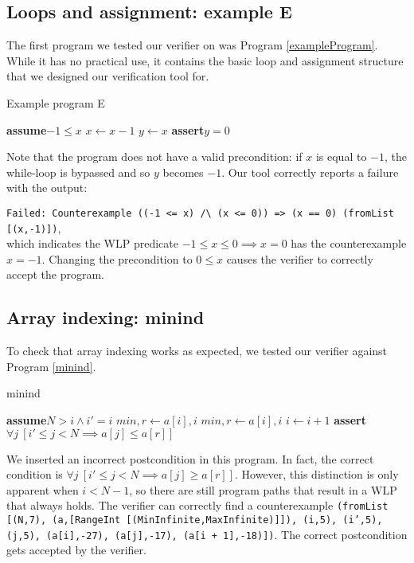 \documentclass[a4paper]{article}
\newcommand{\Assert}{\State\textbf{assert}\xspace}
\newcommand{\Assume}{\State\textbf{assume}\xspace}
\begin{document}
\subsection{Loops and assignment: example E}

The first program we tested our verifier on was Program \ref{exampleProgram}.
While it has no practical use, it contains the basic loop and assignment
structure that we designed our verification tool for.

\begin{algorithm}
\caption{Example program E} \label{exampleProgram}
\begin{algorithmic}
\Assume $-1 \leq x$
	\State $x \gets x - 1$
\EndWhile
\State $y \gets x$
\Assert $y = 0$
\end{algorithmic}
\end{algorithm}

Note that the program does not have a valid precondition: if $x$ is equal to
$-1$, the while-loop is bypassed and so $y$ becomes $-1$. Our tool correctly
reports a failure with the output:\par
\verb|Failed: Counterexample ((-1 <= x) /\ (x <= 0)) => (x == 0) (fromList [(x,-1)])|,\\
which indicates the WLP predicate $-1 \leq x \leq 0 \implies x = 0$ has the
counterexample $x = -1$. Changing the precondition to $0 \leq x$ causes the
verifier to correctly accept the program.

\subsection{Array indexing: minind}

To check that array indexing works as expected, we tested our verifier against Program \ref{minind}.

\begin{algorithm}
\caption{minind} \label{minind}
\begin{algorithmic}
\Assume $N > i \wedge i' = i$
	\State $\textit{min}, r \gets a[i], i$
			\State $\textit{min}, r \gets a[i], i$
		\EndIf
		\State $i \gets i+1$
	\EndWhile
\EndVar
\Assert $\forall j\ [i' \leq j < N \implies a[j] \leq a[r]]$
\end{algorithmic}
\end{algorithm}

We inserted an incorrect postcondition in this program. In fact, the correct condition is $\forall j\ [i' \leq j < N \implies a[j] \geq a[r]]$. However, this distinction is only apparent when $i < N - 1$, so there are still program paths that result in a WLP that always holds. The verifier can correctly find a counterexample \texttt{(fromList [(N,7), (a,[RangeInt [(MinInfinite,MaxInfinite)]]), (i,5), (i',5), (j,5), (a[i],-27), (a[j],-17), (a[i + 1],-18)])}. The correct postcondition gets accepted by the verifier.
\end{document}

